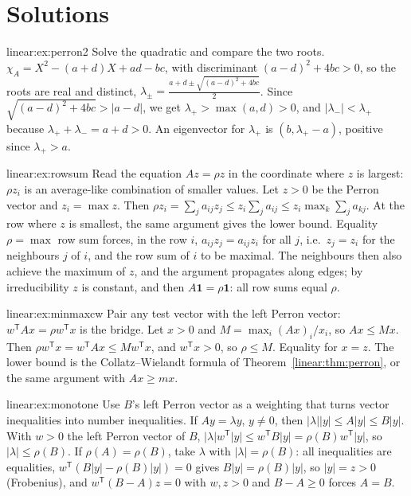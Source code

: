 \section{Solutions}

\begin{solution}{linear:ex:perron2}
\idea Solve the quadratic and compare the two roots.
\writeup $\chi_A=X^2-(a+d)X+ad-bc$, with discriminant $(a-d)^2+4bc>0$, so the roots are real and distinct,
$\lambda_\pm=\frac{a+d\pm\sqrt{(a-d)^2+4bc}}2$. Since $\sqrt{(a-d)^2+4bc}>|a-d|$, we get $\lambda_+>\max(a,d)>0$, and
$|\lambda_-|<\lambda_+$ because $\lambda_++\lambda_-=a+d>0$. An eigenvector for $\lambda_+$ is $(b,\lambda_+-a)$, positive since
$\lambda_+>a$.
\end{solution}

\begin{solution}{linear:ex:rowsum}
\idea Read the equation $Az=\rho z$ in the coordinate where $z$ is largest: $\rho z_i$ is an average-like combination of
smaller values.
\writeup Let $z>0$ be the Perron vector and $z_i=\max z$. Then $\rho z_i=\sum_ja_{ij}z_j\le z_i\sum_ja_{ij}\le z_i\max_k\sum_j
a_{kj}$. At the row where $z$ is smallest, the same argument gives the lower bound. Equality $\rho=\max$ row sum forces, in the
row $i$, $a_{ij}z_j=a_{ij}z_i$ for all $j$, i.e.\ $z_j=z_i$ for the neighbours $j$ of $i$, and the row sum of $i$ to be maximal.
The neighbours then also achieve the maximum of $z$, and the argument propagates along edges; by irreducibility $z$ is constant,
and then $A\mathbf 1=\rho\mathbf 1$: all row sums equal $\rho$.
\end{solution}

\begin{solution}{linear:ex:minmaxcw}
\idea Pair any test vector with the left Perron vector: $w^{\mathsf T}Ax=\rho w^{\mathsf T}x$ is the bridge.
\writeup Let $x>0$ and $M=\max_i(Ax)_i/x_i$, so $Ax\le Mx$. Then $\rho w^{\mathsf T}x=w^{\mathsf T}Ax\le Mw^{\mathsf T}x$, and
$w^{\mathsf T}x>0$, so $\rho\le M$. Equality for $x=z$. The lower bound is the Collatz--Wielandt formula of
Theorem~\ref{linear:thm:perron}, or the same argument with $Ax\ge mx$.
\end{solution}

\begin{solution}{linear:ex:monotone}
\idea Use $B$'s left Perron vector as a weighting that turns vector inequalities into number inequalities.
\writeup If $Ay=\lambda y$, $y\ne0$, then $|\lambda||y|\le A|y|\le B|y|$. With $w>0$ the left Perron vector of $B$,
$|\lambda|w^{\mathsf T}|y|\le w^{\mathsf T}B|y|=\rho(B)w^{\mathsf T}|y|$, so $|\lambda|\le\rho(B)$. If $\rho(A)=\rho(B)$, take
$\lambda$ with $|\lambda|=\rho(B)$: all inequalities are equalities, $w^{\mathsf T}(B|y|-\rho(B)|y|)=0$ gives $B|y|=\rho(B)|y|$, so
$|y|=z>0$ (Frobenius), and $w^{\mathsf T}(B-A)z=0$ with $w,z>0$ and $B-A\ge0$ forces $A=B$.
\end{solution}

